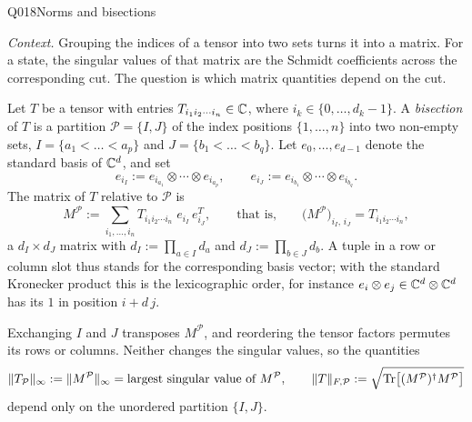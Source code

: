 \begin{entry}{Q018}{Norms and bisections}



\begin{problem}
\emph{Context.} Grouping the indices of a tensor into two sets turns it into a matrix.
For a state, the singular values of that matrix are the Schmidt coefficients across the
corresponding cut. The question is which matrix quantities depend on the cut.

Let $T$ be a tensor with entries $T_{i_1 i_2\cdots i_n}\in\mathbb{C}$, where
$i_k\in\{0,\dots,d_k-1\}$. A \emph{bisection} of $T$ is a partition
$\mathcal{P}=\{I,J\}$ of the index positions $\{1,\dots,n\}$ into two non-empty sets,
$I=\{a_1<\dots<a_p\}$ and $J=\{b_1<\dots<b_q\}$. Let $e_0,\dots,e_{d-1}$ denote the
standard basis of $\mathbb{C}^d$, and set
\[
  e_{i_I} := e_{i_{a_1}}\otimes\cdots\otimes e_{i_{a_p}}, \qquad
  e_{i_J} := e_{i_{b_1}}\otimes\cdots\otimes e_{i_{b_q}} .
\]
The matrix of $T$ relative to $\mathcal{P}$ is
\[
  M^{\mathcal{P}} := \sum_{i_1,\dots,i_n} T_{i_1 i_2\cdots i_n}\; e_{i_I}\, e_{i_J}^{T},
  \qquad\text{that is,}\qquad
  \bigl(M^{\mathcal{P}}\bigr)_{i_I,\,i_J} = T_{i_1 i_2\cdots i_n},
\]
a $d_I\times d_J$ matrix with $d_I:=\prod_{a\in I}d_a$ and $d_J:=\prod_{b\in J}d_b$.
A tuple in a row or column slot thus stands for the corresponding basis vector; with
the standard Kronecker product this is the lexicographic order, for instance
$e_i\otimes e_j\in\mathbb{C}^{d}\otimes\mathbb{C}^{d}$ has its $1$ in position $i+d\,j$.

Exchanging $I$ and $J$ transposes $M^{\mathcal{P}}$, and reordering the tensor factors
permutes its rows or columns. Neither changes the singular values, so the quantities
\[
  \lVert T_{\mathcal{P}}\rVert_{\infty} := \lVert M^{\mathcal{P}}\rVert_{\infty}
    = \text{largest singular value of } M^{\mathcal{P}},
  \qquad
  \lVert T\rVert_{F,\mathcal{P}} := \sqrt{\operatorname{Tr}\bigl[(M^{\mathcal{P}})^{\dagger}M^{\mathcal{P}}\bigr]}
\]
depend only on the unordered partition $\{I,J\}$.


\end{problem}
\end{entry}
